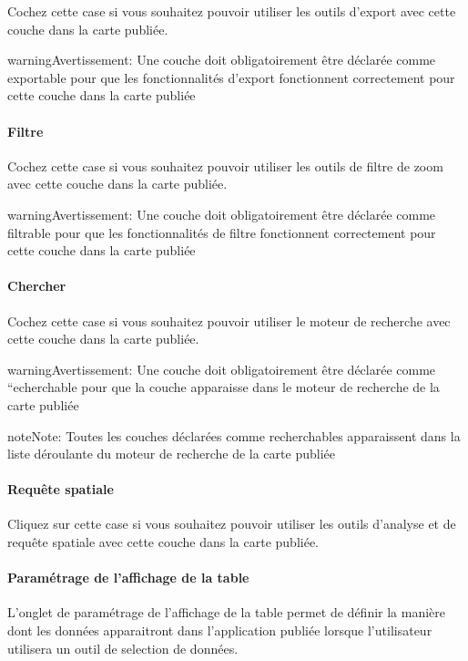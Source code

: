 \documentclass[letterpaper,10pt,french]{sphinxmanual}
\begin{document}
Cochez cette case si vous souhaitez pouvoir utiliser les outils
d'export avec cette couche dans la carte publiée.

\begin{notice}{warning}{Avertissement:}
Une couche doit obligatoirement être déclarée comme exportable
pour que les fonctionnalités d'export fonctionnent
correctement pour cette couche dans la carte publiée
\end{notice}
\paragraph{Filtre}

Cochez cette case si vous souhaitez pouvoir utiliser les outils
de filtre de zoom avec cette couche dans la carte publiée.

\begin{notice}{warning}{Avertissement:}
Une couche doit obligatoirement être déclarée comme filtrable
pour que les fonctionnalités de filtre fonctionnent
correctement pour cette couche dans la carte publiée
\end{notice}
\paragraph{Chercher}

Cochez cette case si vous souhaitez pouvoir utiliser le moteur de
recherche avec cette couche dans la carte publiée.

\begin{notice}{warning}{Avertissement:}
Une couche doit obligatoirement être déclarée comme
``echerchable pour que la couche apparaisse dans le moteur de
recherche de la carte publiée
\end{notice}

\begin{notice}{note}{Note:}
Toutes les couches déclarées comme recherchables apparaissent
dans la liste déroulante du moteur de recherche de la carte
publiée
\end{notice}
\paragraph{Requête spatiale}

Cliquez sur cette case si vous souhaitez pouvoir utiliser les outils
d'analyse et de requête spatiale avec cette couche dans la carte
publiée.


\paragraph{Paramétrage de l'affichage de la table}
\label{maps/layerstree:parametrage-de-l-affichage-de-la-table}
L'onglet de paramétrage de l'affichage de la table permet de définir
la manière dont les données apparaitront dans l'application publiée
lorsque l'utilisateur utilisera un outil de selection de données.
\end{document}
